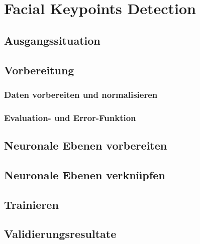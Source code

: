 \chapter{Facial Keypoints Detection}
\label{cha:Facial Keypoints Detection}

\section{Ausgangssituation}

\section{Vorbereitung}

\subsection{Daten vorbereiten und normalisieren}

\subsection{Evaluation- und Error-Funktion}

\section{Neuronale Ebenen vorbereiten}

\section{Neuronale Ebenen verknüpfen}

\section{Trainieren}

\section{Validierungsresultate}